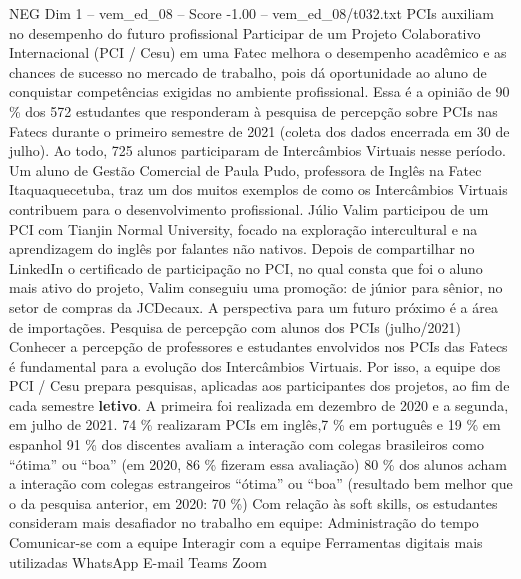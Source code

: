 \begin{textsample}{NEG Dim 1 – vem\_ed\_08 – Score -1.00 – vem\_ed\_08/t032.txt}  \label{ex:f1_neg_023}
PCIs auxiliam no desempenho do futuro profissional Participar de um Projeto Colaborativo Internacional (PCI / Cesu) em uma Fatec melhora o desempenho acadêmico e as chances de sucesso no mercado de trabalho, pois dá oportunidade ao aluno de conquistar competências exigidas no ambiente profissional.
Essa é a opinião de 90 \% dos 572 estudantes que responderam à pesquisa de percepção sobre PCIs nas Fatecs durante o primeiro semestre de 2021 (coleta dos dados encerrada em 30 de julho).
Ao todo, 725 alunos participaram de Intercâmbios Virtuais nesse período.
Um aluno de Gestão Comercial de Paula Pudo, professora de Inglês na Fatec Itaquaquecetuba, traz um dos muitos exemplos de como os Intercâmbios Virtuais contribuem para o desenvolvimento profissional.
Júlio Valim participou de um PCI com Tianjin Normal University, focado na exploração intercultural e na aprendizagem do inglês por falantes não nativos.
Depois de compartilhar no LinkedIn o certificado de participação no PCI, no qual consta que foi o aluno mais ativo do projeto, Valim conseguiu uma promoção: de júnior para sênior, no setor de compras da JCDecaux.
A perspectiva para um futuro próximo é a área de importações.
Pesquisa de percepção com alunos dos PCIs (julho/2021) Conhecer a percepção de professores e estudantes envolvidos nos PCIs das Fatecs é fundamental para a evolução dos Intercâmbios Virtuais.
Por isso, a equipe dos PCI / Cesu prepara pesquisas, aplicadas aos participantes dos projetos, ao fim de cada semestre \textbf{letivo}.
A primeira foi realizada em dezembro de 2020 e a segunda, em julho de 2021. 74 \% realizaram PCIs em inglês,7 \% em português e 19 \% em espanhol 91 \% dos discentes avaliam a interação com colegas brasileiros como “ótima” ou “boa” (em 2020, 86 \% fizeram essa avaliação) 80 \% dos alunos acham a interação com colegas estrangeiros “ótima” ou “boa” (resultado bem melhor que o da pesquisa anterior, em 2020: 70 \%) Com relação às soft skills, os estudantes consideram mais desafiador no trabalho em equipe: Administração do tempo Comunicar-se com a equipe Interagir com a equipe Ferramentas digitais mais utilizadas WhatsApp E-mail Teams Zoom

\end{textsample}
